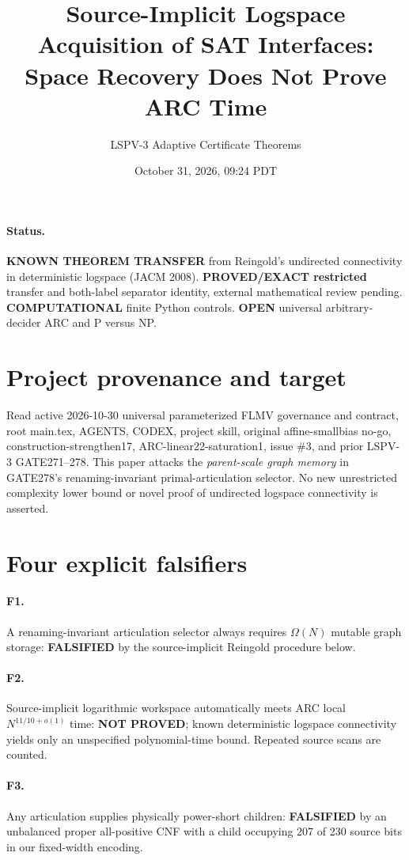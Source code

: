 \documentclass[11pt]{article}
\title{Source-Implicit Logspace Acquisition of SAT Interfaces: Space Recovery Does Not Prove ARC Time}
\author{LSPV-3 Adaptive Certificate Theorems}
\date{October 31, 2026, 09:24 PDT}
\begin{document}
\maketitle
\paragraph{Status.}
\textbf{KNOWN THEOREM TRANSFER} from Reingold's undirected connectivity in deterministic logspace (JACM 2008).
\textbf{PROVED/EXACT restricted} transfer and both-label separator identity, external mathematical review pending.
\textbf{COMPUTATIONAL} finite Python controls. \textbf{OPEN} universal arbitrary-decider ARC and P versus NP.

\section{Project provenance and target}
Read active 2026-10-30 universal parameterized FLMV governance and contract, root main.tex, AGENTS, CODEX, project skill, original affine-smallbias no-go, construction-strengthen17, ARC-linear22-saturation1, issue \#3, and prior LSPV-3 GATE271--278. This paper attacks the \emph{parent-scale graph memory} in GATE278's renaming-invariant primal-articulation selector. No new unrestricted complexity lower bound or novel proof of undirected logspace connectivity is asserted.

\section{Four explicit falsifiers}
\paragraph{F1.} A renaming-invariant articulation selector always requires $\Omega(N)$ mutable graph storage: \textbf{FALSIFIED} by the source-implicit Reingold procedure below.
\paragraph{F2.} Source-implicit logarithmic workspace automatically meets ARC local $N^{11/10+o(1)}$ time: \textbf{NOT PROVED}; known deterministic logspace connectivity yields only an unspecified polynomial-time bound. Repeated source scans are counted.
\paragraph{F3.} Any articulation supplies physically power-short children: \textbf{FALSIFIED} by an unbalanced proper all-positive CNF with a child occupying 207 of 230 source bits in our fixed-width encoding.
\end{document}
